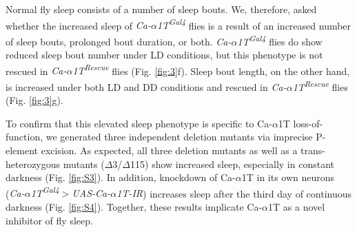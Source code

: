 Normal fly sleep consists of a number of sleep bouts.
We, therefore, asked whether the increased sleep of \emph{Ca-$\alpha$1T\textsuperscript{Gal4}} flies is a result of an increased number of sleep bouts, prolonged bout duration, or both.
\emph{Ca-$\alpha$1T\textsuperscript{Gal4}} flies do show reduced sleep bout number under LD conditions, but this phenotype is not rescued in \emph{Ca-$\alpha$1T\textsuperscript{Rescue}} flies (Fig. \ref{fig:3}f).
Sleep bout length, on the other hand, is increased under both LD and DD conditions and rescued in \emph{Ca-$\alpha$1T\textsuperscript{Rescue}} flies (Fig. \ref{fig:3}g).

To confirm that this elevated sleep phenotype is specific to Ca-$\alpha$1T loss-of-function, we generated three independent deletion mutants via imprecise P-element excision.
As expected, all three deletion mutants as well as a trans-heterozygous mutants ($\Delta$3/$\Delta$115) show increased sleep, especially in constant darkness (Fig. \ref{fig:S3}).
In addition, knockdown of Ca-$\alpha$1T in its own neurons (\emph{Ca-$\alpha$1T\textsuperscript{Gal4}$>${}UAS-Ca-$\alpha$1T-IR}) increases sleep after the third day of continuous darkness (Fig. \ref{fig:S4}).
Together, these results implicate Ca-$\alpha$1T as a novel inhibitor of fly sleep.
  